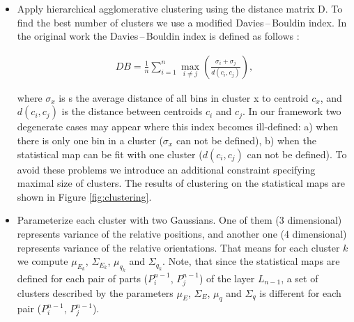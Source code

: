 \documentclass[conference]{IEEEtran}
\begin{document}
{\begin{itemize}
    All quaternions must be normalized before computing the distance
    matrix. Similar distance measures are discussed in
    \cite{kuffner2004effective}.
    \item Apply hierarchical agglomerative clustering using the distance
    matrix D. To find the best number of clusters we use a
    modified Davies\,--\,Bouldin index. In the original work the Davies\,--\,Bouldin
    index is defined as follows \cite{davies1979cluster}:

    \begin{align}
    DB = \frac{1}{n}\sum\limits_{i=1}^{n} \max\limits_{i \neq j}^{} \left(\frac{\sigma_i + \sigma_j}{d(c_i, c_j)}\right),
    \end{align}

    where $\sigma_x$ is s the average distance of all bins in cluster x
    to centroid $c_x$, and $d(c_i,c_j)$ is the distance between centroids $c_i$ and
    $c_j$.
    In our framework two degenerate cases may appear where this index
    becomes ill-defined: a) when there is only one bin in a cluster ($\sigma_x$ can not be
    defined), b) when the statistical map can be fit with one cluster
    ($d(c_i, c_j)$ can not be defined). To avoid these
    problems we introduce an additional constraint specifying maximal size of
    clusters. The results of clustering on the statistical maps are shown in
    Figure \ref{fig:clustering}.

    \item Parameterize each cluster with two Gaussians. One of them (3 dimensional) represents
variance of the relative positions, and another one (4 dimensional)
represents variance of the relative orientations. That means for
each cluster $k$ we compute $\mu_{E_k}$, $\Sigma_{E_k}$, $\mu_{q_k}$
and $\Sigma_{q_k}$. Note, that since the statistical maps are
defined for each pair of parts ($P_i^{n-1}$, $P_j^{n-1}$) of the
layer $L_{n-1}$, a set of clusters described by the parameters
$\mu_E$, $\Sigma_E$, $\mu_q$ and $\Sigma_q$ is different for each
pair ($P_i^{n-1}$, $P_j^{n-1}$).
\end{itemize}

}
\end{document}

